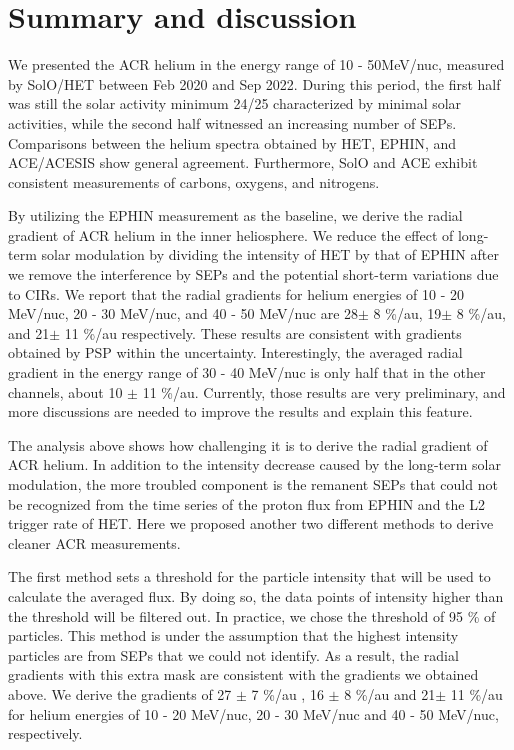 \section{ Summary and discussion}

We presented the \ac{ACR} helium in the energy range of 10 - 50MeV/nuc, measured by \ac{SolO}/\ac{HET} between Feb 2020 and Sep 2022. During this period, the first half was still the solar activity minimum 24/25 characterized by minimal solar activities, while the second half witnessed an increasing number of \acp{SEP}.
Comparisons between the helium spectra obtained by \ac{HET}, \ac{EPHIN}, and \ac{ACE}/\ac{ACESIS} show general agreement. Furthermore, \ac{SolO} and \ac{ACE} exhibit consistent measurements of carbons, oxygens, and nitrogens.

By utilizing the \ac{EPHIN} measurement as the baseline, we derive the radial gradient of \ac{ACR} helium in the inner heliosphere. We reduce the effect of long-term solar modulation by dividing the intensity of  \ac{HET} by that of \ac{EPHIN} 
after we remove the interference by \acp{SEP} and the potential short-term variations due to \acp{CIR}.
We report that the radial gradients for helium energies of 10 - 20 MeV/nuc, 20 - 30 MeV/nuc, and 40 - 50 MeV/nuc are 28$\pm$ 8 \%/au, 19$\pm$ 8 \%/au, and 21$\pm$ 11 \%/au respectively. 
These results are consistent with gradients obtained by \ac{PSP} within the uncertainty. Interestingly, the averaged radial gradient in the energy range of 30 - 40 MeV/nuc is only half that in the other channels, about 10 $\pm$ 11 \%/au. Currently, those results are very preliminary, and more discussions are needed to improve the results and explain this feature.

The analysis above shows how challenging it is to derive the radial gradient of \ac{ACR} helium. In addition to the intensity decrease caused by the long-term solar modulation, the more troubled component is the remanent \acp{SEP} that could not be recognized from the time series of the proton flux from \ac{EPHIN} and the L2 trigger rate of \ac{HET}. Here we proposed another two different methods to derive cleaner \ac{ACR} measurements.

The first method sets a threshold for the particle intensity that will be used to calculate the averaged flux. By doing so, the data points of intensity higher than the threshold will be filtered out. In practice, we chose the threshold of 95 \% of particles. This method is under the assumption that the highest intensity particles are from \acp{SEP} that we could not identify. As a result, the radial gradients with this extra mask are consistent with the gradients we obtained above. We derive the gradients of 27 $\pm$ 7 \%/au , 16 $\pm$ 8 \%/au and 21$\pm$ 11 \%/au for helium energies of 10 - 20 MeV/nuc, 20 - 30 MeV/nuc and 40 - 50 MeV/nuc, respectively. 


